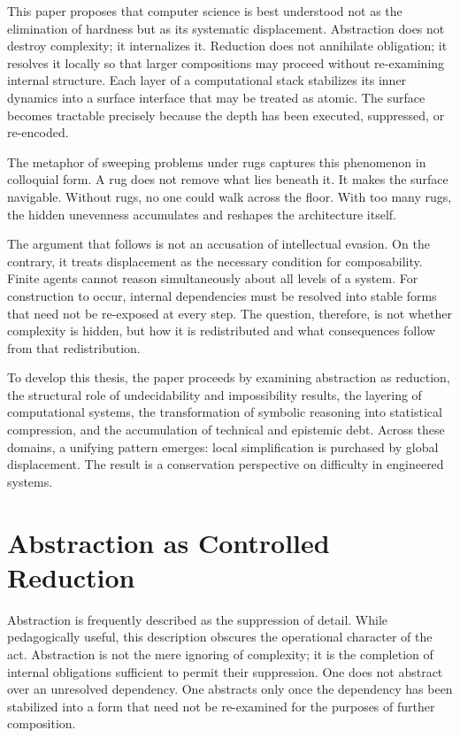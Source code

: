 \documentclass[11pt]{article}
\begin{document}
This paper proposes that computer science is best understood not as the elimination of hardness but as its systematic displacement. Abstraction does not destroy complexity; it internalizes it. Reduction does not annihilate obligation; it resolves it locally so that larger compositions may proceed without re-examining internal structure. Each layer of a computational stack stabilizes its inner dynamics into a surface interface that may be treated as atomic. The surface becomes tractable precisely because the depth has been executed, suppressed, or re-encoded.

The metaphor of sweeping problems under rugs captures this phenomenon in colloquial form. A rug does not remove what lies beneath it. It makes the surface navigable. Without rugs, no one could walk across the floor. With too many rugs, the hidden unevenness accumulates and reshapes the architecture itself.

The argument that follows is not an accusation of intellectual evasion. On the contrary, it treats displacement as the necessary condition for composability. Finite agents cannot reason simultaneously about all levels of a system. For construction to occur, internal dependencies must be resolved into stable forms that need not be re-exposed at every step. The question, therefore, is not whether complexity is hidden, but how it is redistributed and what consequences follow from that redistribution.

To develop this thesis, the paper proceeds by examining abstraction as reduction, the structural role of undecidability and impossibility results, the layering of computational systems, the transformation of symbolic reasoning into statistical compression, and the accumulation of technical and epistemic debt. Across these domains, a unifying pattern emerges: local simplification is purchased by global displacement. The result is a conservation perspective on difficulty in engineered systems.

\section{Abstraction as Controlled Reduction}

Abstraction is frequently described as the suppression of detail. While pedagogically useful, this description obscures the operational character of the act. Abstraction is not the mere ignoring of complexity; it is the completion of internal obligations sufficient to permit their suppression. One does not abstract over an unresolved dependency. One abstracts only once the dependency has been stabilized into a form that need not be re-examined for the purposes of further composition.
\end{document}
